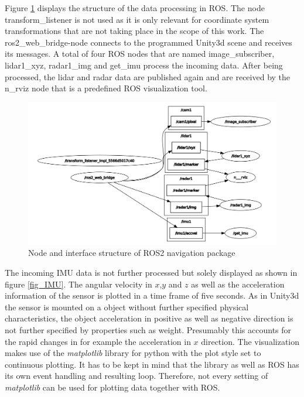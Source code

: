Figure \ref{fig_rqt} displays the structure of the data processing in \ac{ROS}. The node transform\_listener is not used as it is only relevant for coordinate system transformations that are not taking place in the scope of this work. The ros2\_web\_bridge-node connects to the programmed Unity3d scene and receives its messages. A total of four \ac{ROS} nodes that are named image\_subscriber, lidar1\_xyz, radar1\_img and get\_imu process the incoming data. After being processed, the lidar and radar data are published again and are received by the n\_rviz node that is a predefined \ac{ROS} visualization tool.  \\
\begin{figure}
	\centering
	\includegraphics[width=.99\linewidth]{Bilder/rviz2.png}
	\caption{Node and interface structure of ROS2 navigation package}
	\label{fig_rqt}
\end{figure}

The incoming \ac{IMU} data is not further processed but solely displayed as shown in figure \ref{fig_IMU}. The angular velocity in $x$,$y$ and $z$ as well as the acceleration information of the sensor is plotted in a time frame of five seconds. As in Unity3d the sensor is mounted on a object without further specified physical characteristics, the object acceleration in positive as well as negative direction is not further specified by properties such as weight. Presumably this accounts for the rapid changes in for example the acceleration in $x$ direction. The visualization makes use of the \textit{matplotlib} library for python with the plot style set to continuous plotting. It has to be kept in mind that the library as well as \ac{ROS} has its own event handling and resulting loop. Therefore, not every setting of \textit{matplotlib} can be used for plotting data together with \ac{ROS}. \\

